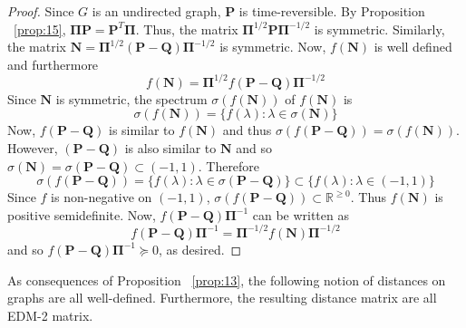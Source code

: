 \begin{proof}
  Since $G$ is an undirected graph, $\mathbf{P}$ is time-reversible. By
  Proposition ~\ref{prop:15}, $\bm{\Pi}\mathbf{P} =
  \mathbf{P}^{T}\bm{\Pi}$. Thus, the matrix
  $\bm{\Pi}^{1/2}\mathbf{P}\bm{\Pi}^{-1/2}$ is
  symmetric. Similarly, the matrix $\mathbf{N} =
  \bm{\Pi}^{1/2}(\mathbf{P} - \mathbf{Q})\bm{\Pi}^{-1/2}$ is
  symmetric. Now, $f(\mathbf{N})$ is well defined and furthermore
  \begin{equation}
    \label{eq:66}
    f(\mathbf{N}) = \bm{\Pi}^{1/2}f(\mathbf{P} - \mathbf{Q})\bm{\Pi}^{-1/2}
  \end{equation}
  Since $\mathbf{N}$ is symmetric, the spectrum 
  $\sigma(f(\mathbf{N}))$ of $f(\mathbf{N})$ is
  \begin{equation}
    \label{eq:67}
    \sigma(f(\mathbf{N})) = \{ f(\lambda) \colon \lambda \in
    \sigma(\mathbf{N}) \}
  \end{equation}
  Now, $f(\mathbf{P} - \mathbf{Q})$ is similar to $f(\mathbf{N})$ and
  thus $\sigma(f(\mathbf{P} - \mathbf{Q})) =
  \sigma(f(\mathbf{N}))$. However, $(\mathbf{P} - \mathbf{Q})$ is also
  similar to $\mathbf{N}$ and so $\sigma(\mathbf{N}) =
  \sigma(\mathbf{P} - \mathbf{Q}) \subset
  (-1,1)$. Therefore 
  \begin{equation}
    \label{eq:68}
    \sigma(f(\mathbf{P} - \mathbf{Q})) = \{ f(\lambda) \colon \lambda \in
    \sigma(\mathbf{P} - \mathbf{Q})\} \subset \{ f(\lambda) \colon
    \lambda \in (-1,1) \}
  \end{equation}
  Since $f$ is non-negative on $(-1,1)$, $\sigma(f(\mathbf{P} -
  \mathbf{Q})) \subset \mathbb{R}^{\geq 0}$. Thus $f(\mathbf{N})$ is
  positive semidefinite. Now, $f(\mathbf{P} -
  \mathbf{Q})\bm{\Pi}^{-1}$ can be written as
  \begin{equation}
    \label{eq:69}
f(\mathbf{P} - \mathbf{Q})\bm{\Pi}^{-1} = \bm{\Pi}^{-1/2}
f(\mathbf{N}) \bm{\Pi}^{-1/2}
  \end{equation}
and so $f(\mathbf{P} - \mathbf{Q})\bm{\Pi}^{-1} \succeq
0$, as desired. 
\end{proof}
As consequences of Proposition ~\ref{prop:13}, the following notion of
distances on graphs are all well-defined. Furthermore, the resulting
distance matrix are all EDM-2 matrix.
